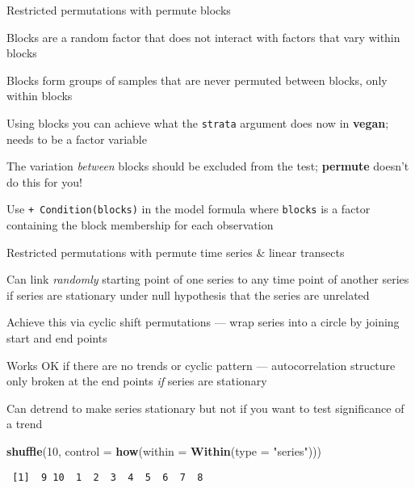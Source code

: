 \documentclass[10pt,ignorenonframetext,compress, aspectratio=169]{beamer}
\newenvironment{Shaded}{\begin{snugshade}}{\end{snugshade}}
\newcommand{\KeywordTok}[1]{\textcolor[rgb]{0.13,0.29,0.53}{\textbf{{#1}}}}
\newcommand{\DataTypeTok}[1]{\textcolor[rgb]{0.13,0.29,0.53}{{#1}}}
\newcommand{\DecValTok}[1]{\textcolor[rgb]{0.00,0.00,0.81}{{#1}}}
\newcommand{\StringTok}[1]{\textcolor[rgb]{0.31,0.60,0.02}{{#1}}}
\newcommand{\NormalTok}[1]{{#1}}
\begin{document}
\begin{frame}{Restricted permutations with permute \textbar{} blocks}

Blocks are a random factor that does not interact with factors that vary
within blocks

Blocks form groups of samples that are never permuted between blocks,
only within blocks

Using blocks you can achieve what the \texttt{strata} argument does now
in \textbf{vegan}; needs to be a factor variable

The variation \emph{between} blocks should be excluded from the test;
\textbf{permute} doesn't do this for you!

Use \texttt{+\ Condition(blocks)} in the model formula where
\texttt{blocks} is a factor containing the block membership for each
observation

\end{frame}

\begin{frame}[fragile]{Restricted permutations with permute \textbar{}
time series \& linear transects}

Can link \emph{randomly} starting point of one series to any time point
of another series if series are stationary under null hypothesis that
the series are unrelated

Achieve this via cyclic shift permutations --- wrap series into a circle
by joining start and end points

Works OK if there are no trends or cyclic pattern --- autocorrelation
structure only broken at the end points \emph{if} series are stationary

Can detrend to make series stationary but not if you want to test
significance of a trend

\scriptsize

\begin{Shaded}
\begin{Highlighting}[]
\KeywordTok{shuffle}\NormalTok{(}\DecValTok{10}\NormalTok{, }\DataTypeTok{control =} \KeywordTok{how}\NormalTok{(}\DataTypeTok{within =} \KeywordTok{Within}\NormalTok{(}\DataTypeTok{type =} \StringTok{"series"}\NormalTok{)))}
\end{Highlighting}
\end{Shaded}

\begin{verbatim}
 [1]  9 10  1  2  3  4  5  6  7  8
\end{verbatim}

\normalsize

\end{frame}
\end{document}
